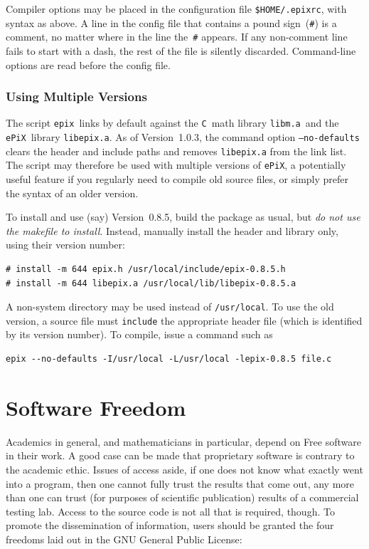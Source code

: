 \documentclass[12pt]{report}
\newcommand{\code}[1]{\texttt{#1}}
\newcommand{\filename}[1]{\texttt{#1}}
\newcommand{\ePiX}{\code{ePiX}}
\begin{document}
Compiler options may be placed in the configuration file
\filename{\$HOME/.epixrc}, with syntax as above. A line in the config
file that contains a pound sign~(\code{\#}) is a comment, no matter
where in the line the~\code{\#} appears. If any non-comment line
fails to start with a dash, the rest of the file is silently
discarded.  Command-line options are read before the config file.


\subsection*{Using Multiple Versions}

The script \filename{epix}~links by default against the \code{C}~math
library \code{libm.a}~and the \ePiX\ library \code{libepix.a}. As of
Version~1.0.3, the command option \code{--no-defaults} clears the
header and include paths and removes \code{libepix.a} from the link
list. The script may therefore be used with multiple versions of
\ePiX, a potentially useful feature if you regularly need to compile
old source files, or simply prefer the syntax of an older version.

To install and use (say) Version~0.8.5, build the package as usual,
but \emph{do not use the makefile to install}. Instead, manually
install the header and library only, using their version number:
\begin{verbatim}
# install -m 644 epix.h /usr/local/include/epix-0.8.5.h
# install -m 644 libepix.a /usr/local/lib/libepix-0.8.5.a
\end{verbatim}
A non-system directory may be used instead of \filename{/usr/local}.
To use the old version, a source file must \code{include} the
appropriate header file (which is identified by its version number).
To compile, issue a command such as
\begin{verbatim}
epix --no-defaults -I/usr/local -L/usr/local -lepix-0.8.5 file.c
\end{verbatim}



\appendix
\chapter{Software Freedom}

Academics in general, and mathematicians in particular, depend on Free
software in their work. A good case can be made that proprietary
software is contrary to the academic ethic. Issues of access aside, if
one does not know what exactly went into a program, then one cannot
fully trust the results that come out, any more than one can trust
(for purposes of scientific publication) results of a commercial
testing lab.  Access to the source code is not all that is required,
though. To promote the dissemination of information, users should be
granted the four freedoms laid out in the GNU General Public License:
\smallskip
\end{document}
